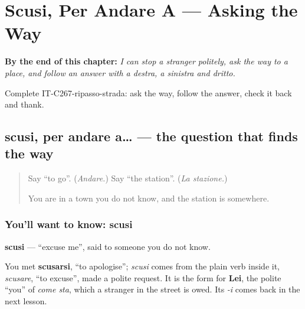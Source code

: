 
\chapter{Scusi, Per Andare A --- Asking the Way}
\label{ch:it-asking-the-way}

\begin{chapteropening}
\textbf{By the end of this chapter:} \emph{I can stop a stranger politely, ask the way to a place, and follow an answer with a destra, a sinistra and dritto.}

Complete IT-C267-ripasso-strada: ask the way, follow the answer, check it back and thank.
\end{chapteropening}

\section[scusi, per andare a…?]{scusi, per andare a… — the question that finds the way}

\label{lesson:IT-C267-scusi}



\begin{quote}
Say \textquotedblleft{}to go\textquotedblright{}. (\emph{Andare.}) Say \textquotedblleft{}the station\textquotedblright{}. (\emph{La stazione.})

You are in a town you do not know, and the station is somewhere.
\end{quote}

\subsection*{You'll want to know: scusi}
\textbf{scusi} — \textquotedblleft{}excuse me\textquotedblright{}, said to someone you do not know.

You met \textbf{scusarsi}, \textquotedblleft{}to apologise\textquotedblright{}; \emph{scusi} comes from the plain verb inside it, \emph{scusare}, \textquotedblleft{}to excuse\textquotedblright{}, made a polite request. It is the form for \textbf{Lei}, the polite \textquotedblleft{}you\textquotedblright{} of \emph{come sta}, which a stranger in the street is owed. Its \emph{-i} comes back in the next lesson.

